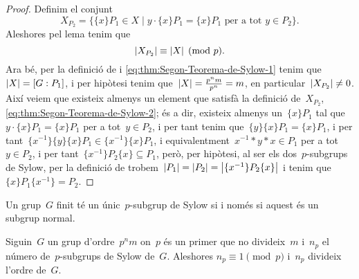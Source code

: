 \documentclass[../estructures-algebraiques.tex]{subfiles}
\begin{document}
\begin{proof}
        Definim el conjunt
        \begin{equation}
    \label{eq:thm:Segon-Teorema-de-Sylow-2}
        X_{P_{2}}=\{\{x\}P_{1}\in X\mid y\cdot\{x\}P_{1}=\{x\}P_{1}\text{ per a tot }y\in P_{2}\}.
        \end{equation}
        Aleshores pel lema  tenim que
        \begin{equation*}
        \abs{X_{P_{2}}}\equiv\abs{X}\pmod{p}.
        \end{equation*}
        Ara bé, per la definició de  i \eqref{eq:thm:Segon-Teorema-de-Sylow-1} tenim que~\(\abs{X}=[G:P_{1}]\), i per hipòtesi tenim que~\(\abs{X}=\frac{p^{n}m}{p^{n}}=m\), en particular~\(\abs{X_{P_{2}}}\neq0\).
        Així veiem que existeix almenys un element que satisfà la definició de~\(X_{P_{2}}\), \eqref{eq:thm:Segon-Teorema-de-Sylow-2}; és a dir, existeix almenys un~\(\{x\}P_{1}\) tal que~\(y\cdot\{x\}P_{1}=\{x\}P_{1}\) per a tot~\(y\in P_{2}\), i per tant tenim que~\(\{y\}\{x\}P_{1}=\{x\}P_{1}\), i per tant~\(\{x^{-1}\}\{y\}\{x\}P_{1}\in \{x^{-1}\}\{x\}P_{1}\), i equivalentment~\(x^{-1}\ast y\ast x\in P_{1}\) per a tot~\(y\in P_{2}\), i per tant~\(\{x^{-1}\}P_{2}\{x\}\subseteq P_{1}\), però, per hipòtesi, al ser els dos~\(p\)-subgrups de Sylow, per la definició de  trobem~\(\abs{P_{1}}=\abs{P_{2}}=\abs{\{x^{-1}\}P_{2}\{x\}}\) i tenim que~\(\{x\}P_{1}\{x^{-1}\}=P_{2}\).
    \end{proof}
    \begin{corollary}
        \label{corollary:Segon-Teorema-de-Sylow} %
        Un grup~\(G\) finit té un únic~\(p\)-subgrup de Sylow si i només si aquest és un subgrup normal.
    \end{corollary}
    \begin{theorem}
        \label{thm:Tercer-Teorema-de-Sylow}
        Siguin~\(G\) un grup d'ordre~\(p^{n}m\) on~\(p\) és un primer que no divideix~\(m\) i~\(n_{p}\) el número de~\(p\)-subgrups de Sylow de~\(G\).
        Aleshores
        \(n_{p}\equiv1\pmod{p}\) i~\(n_{p}\) divideix l'ordre de~\(G\).
    \end{theorem}
\end{document}
